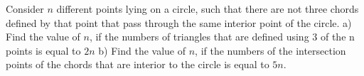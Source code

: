 Consider $n$ different points lying on a circle, such that there are not three chords defined by that point that pass through the same interior point of the circle.
a) Find the value of $n$, if the numbers of triangles that are defined using $3$ of the n points is equal to $2n$
b) Find the value of $n$, if the numbers of the intersection points of the chords that are interior to the circle  is equal to $5n$.